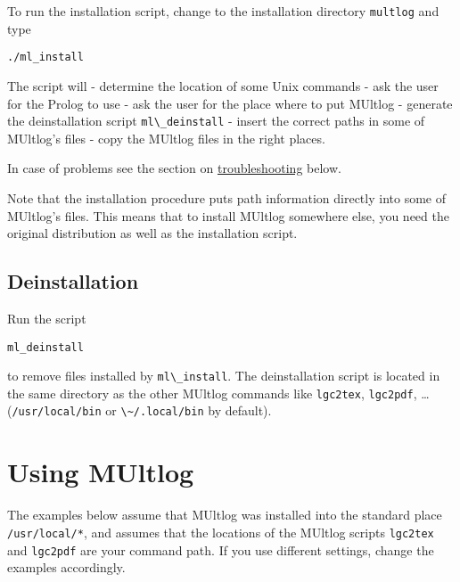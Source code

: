 \documentclass[
]{article}
\newcommand{\passthrough}[1]{#1}
\begin{document}
To run the installation script, change to the installation directory
\passthrough{\lstinline!multlog!} and type

\begin{lstlisting}
./ml_install
\end{lstlisting}

The script will - determine the location of some Unix commands - ask the
user for the Prolog to use - ask the user for the place where to put
MUltlog - generate the deinstallation script
\passthrough{\lstinline!ml\_deinstall!} - insert the correct paths in
some of MUltlog's files - copy the MUltlog files in the right places.

In case of problems see the section on
\protect\hyperlink{troubleshooting}{troubleshooting} below.

Note that the installation procedure puts path information directly into
some of MUltlog's files. This means that to install MUltlog somewhere
else, you need the original distribution as well as the installation
script.

\hypertarget{deinstallation}{%
\subsection{Deinstallation}\label{deinstallation}}

Run the script

\begin{lstlisting}
ml_deinstall
\end{lstlisting}

to remove files installed by \passthrough{\lstinline!ml\_install!}. The
deinstallation script is located in the same directory as the other
MUltlog commands like \passthrough{\lstinline!lgc2tex!},
\passthrough{\lstinline!lgc2pdf!}, \ldots{}
(\passthrough{\lstinline!/usr/local/bin!} or
\passthrough{\lstinline!\~/.local/bin!} by default).

\hypertarget{using-multlog}{%
\section{Using MUltlog}\label{using-multlog}}

The examples below assume that MUltlog was installed into the standard
place \passthrough{\lstinline!/usr/local/*!}, and assumes that the
locations of the MUltlog scripts \passthrough{\lstinline!lgc2tex!} and
\passthrough{\lstinline!lgc2pdf!} are your command path. If you use
different settings, change the examples accordingly.
\end{document}
